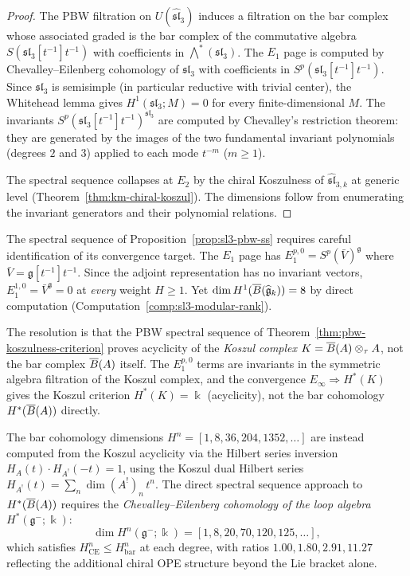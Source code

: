 \begin{proof}
The PBW filtration on $U(\widehat{\mathfrak{sl}}_3)$ induces a filtration
on the bar complex whose associated graded is the bar complex of the
commutative algebra $S(\mathfrak{sl}_3[t^{-1}]t^{-1})$ with coefficients in
$\bigwedge^*(\mathfrak{sl}_3)$.  The $E_1$ page is computed by
Chevalley--Eilenberg cohomology of $\mathfrak{sl}_3$ with coefficients in
$S^p(\mathfrak{sl}_3[t^{-1}]t^{-1})$.  Since $\mathfrak{sl}_3$ is semisimple
(in particular reductive with trivial center), the Whitehead lemma gives
$H^1(\mathfrak{sl}_3; M) = 0$ for every finite-dimensional $M$.  The invariants
$S^p(\mathfrak{sl}_3[t^{-1}]t^{-1})^{\mathfrak{sl}_3}$ are computed by
Chevalley's restriction theorem: they are generated by the images of the
two fundamental invariant polynomials (degrees $2$ and $3$) applied to
each mode $t^{-m}$ ($m \geq 1$).

The spectral sequence collapses at $E_2$ by the chiral Koszulness of
$\widehat{\mathfrak{sl}}_{3,k}$ at generic level
(Theorem~\ref{thm:km-chiral-koszul}).  The dimensions follow from
enumerating the invariant generators and their polynomial relations.
\end{proof}

\begin{remark}
\label{rem:pbw-convergence-target}
The spectral sequence of Proposition~\ref{prop:sl3-pbw-ss} requires
careful identification of its convergence target.  The $E_1$ page
has $E_1^{p,0} = S^p(\bar{V})^{\mathfrak{g}}$ where
$\bar{V} = \mathfrak{g}[t^{-1}]t^{-1}$.
Since the adjoint representation has no invariant vectors,
$E_1^{1,0} = \bar{V}^{\mathfrak{g}} = 0$
at \emph{every} weight $H \geq 1$.  Yet $\dim H^1(\overline{B}(\widehat{\mathfrak{g}}_k)) = 8$
by direct computation (Computation~\ref{comp:sl3-modular-rank}).

The resolution is that the PBW spectral sequence of
Theorem~\ref{thm:pbw-koszulness-criterion} proves acyclicity
of the \emph{Koszul complex} $K = \overline{B}(A) \otimes_\tau A$,
not the bar complex $\overline{B}(A)$ itself.  The $E_1^{p,0}$ terms
are invariants in the symmetric algebra filtration of the
Koszul complex, and the convergence
$E_\infty \Rightarrow H^*(K)$ gives the Koszul criterion
$H^*(K) = \Bbbk$ (acyclicity), not the bar cohomology
$H^*(\overline{B}(A))$ directly.

The bar cohomology dimensions $H^n = [1, 8, 36, 204, 1352, \ldots]$
are instead computed from the Koszul acyclicity via the Hilbert
series inversion $H_A(t) \cdot H_{A^!}(-t) = 1$, using the
Koszul dual Hilbert series
$H_{A^!}(t) = \sum_n \dim(A^!)_n \, t^n$.
The direct spectral sequence approach to $H^*(\overline{B}(A))$
requires the \emph{Chevalley--Eilenberg cohomology of the
loop algebra} $H^*(\mathfrak{g}^-; \Bbbk)$:
\[
\dim H^n(\mathfrak{g}^-; \Bbbk) =
[1, 8, 20, 70, 120, 125, \ldots],
\]
which satisfies $H^n_{\mathrm{CE}} \leq H^n_{\mathrm{bar}}$
at each degree, with ratios $1.00, 1.80, 2.91, 11.27$ reflecting the
additional chiral OPE structure beyond the Lie bracket alone.
\end{remark}

